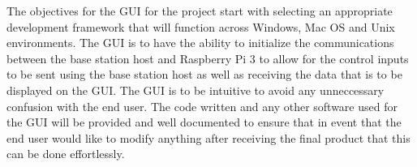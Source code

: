 The objectives for the GUI for the project start with selecting an appropriate development framework that will function across Windows, Mac OS and Unix environments.  The GUI is to have the ability to initialize the communications between the base station host and Raspberry Pi 3 to allow for the control inputs to be sent using the base station host as well as receiving the data that is to be displayed on the GUI. The GUI is to be intuitive to avoid any unneccessary confusion with the end user. The code written and any other software used for the GUI will be provided and well documented to ensure that in event that the end user would like to modify anything after receiving the final product that this can be done effortlessly. 
  
